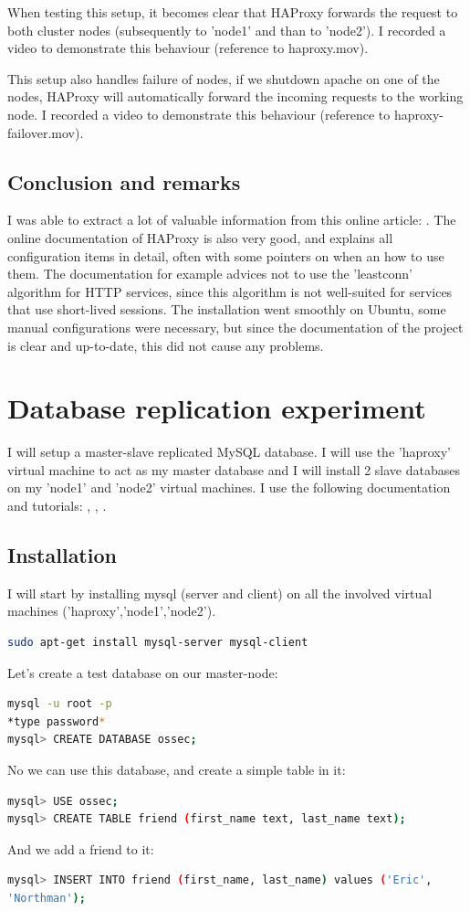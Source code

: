 \documentclass[12pt]{report}
\begin{document}
When testing this setup, it becomes clear that HAProxy forwards the
request to both cluster nodes (subsequently to 'node1' and than to
'node2').
I recorded a video to demonstrate this behaviour (reference to
haproxy.mov).

This setup also handles failure of nodes, if we shutdown apache on one
of the nodes, HAProxy will automatically forward the incoming requests
to the working node. 
I recorded a video to demonstrate this behaviour (reference to
haproxy-failover.mov).

\subsection{Conclusion and remarks}
I was able to extract a lot of valuable information from this online
article: \cite{haproxy_install_tutorial}. The online documentation of
 HAProxy \cite{haproxy:2013} is also very good, and explains all
 configuration items in detail, often with some pointers on when an
 how to use them. The documentation for example advices not to use the
 'leastconn' algorithm for HTTP services, since this algorithm is not
 well-suited for services that use short-lived sessions.
The installation went smoothly on Ubuntu, some manual configurations
were necessary, but since the documentation of the project is clear
and up-to-date, this did not cause any problems.

\section{Database replication experiment}
I will setup a master-slave replicated MySQL database. I will use the
'haproxy' virtual machine to act as my master database and I will
install 2 slave databases on my 'node1' and 'node2' virtual machines.
I use the following documentation and tutorials:
\cite{mysql_official_replication_doc}, \cite{mysql_replication_howtoforge}, \cite{mysql_replication_stackexchange}.

\subsection{Installation} 
I will start by installing mysql (server and client) on all the involved virtual
machines ('haproxy','node1','node2').
\begin{lstlisting}[language=bash]
sudo apt-get install mysql-server mysql-client
\end{lstlisting}

Let's create a test database on our master-node:
\begin{lstlisting}[language=bash]
mysql -u root -p
*type password*
mysql> CREATE DATABASE ossec;
\end{lstlisting}
No we can use this database, and create a simple table in it:
\begin{lstlisting}[language=bash]
mysql> USE ossec;
mysql> CREATE TABLE friend (first_name text, last_name text);
\end{lstlisting}
And we add a friend to it:
\begin{lstlisting}[language=bash]
mysql> INSERT INTO friend (first_name, last_name) values ('Eric',
'Northman');
\end{lstlisting}
\end{document}
